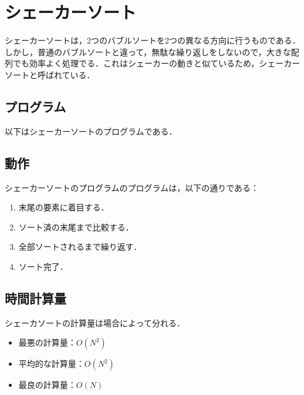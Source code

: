 \documentclass[a4j, titlepage]{jarticle}
\begin{document}
        
    \section{シェーカーソート}
        シェーカーソートは，2つのバブルソートを2つの異なる方向に行うものである．しかし，普通のバブルソートと違って，無駄な繰り返しをしないので，大きな配列でも効率よく処理でる\cite{cite:geek}．これはシェーカーの動きと似ているため，シェーカーソートと呼ばれている．

        \subsection{プログラム}
            以下はシェーカーソートのプログラムである．
            
        
        \subsection{動作}
        シェーカーソートのプログラムのプログラムは，以下の通りである：
            \begin{screen}
                \begin{enumerate}
                    \item 末尾の要素に着目する．
                    \item ソート済の末尾まで比較する．
                    \item 全部ソートされるまで繰り返す．
                    \item ソート完了．
                \end{enumerate}
            \end{screen}
        
        \subsection{時間計算量}
            シェーカソートの計算量は場合によって分れる．
            \begin{itemize}
                \item 最悪の計算量：$O(N^2)$
                \item 平均的な計算量：$O(N^2)$
                \item 最良の計算量：$O(N)$
            \end{itemize}
\end{document}
